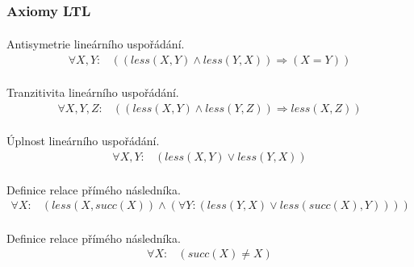 \documentclass[a4paper,journal]{IEEEtran}
\begin{document}
\subsection{}
\subsubsection{Axiomy LTL}
\paragraph*{}{Antisymetrie lineárního uspořádání.}
\begin{equation}
\begin{split}
\forall X,Y:&\left( \left( less \left(X,Y\right) \wedge less\left(Y,X\right) \right) \Rightarrow \left(X = Y\right) \right)
\end{split}
\end{equation}
\paragraph*{}{Tranzitivita lineárního uspořádání.}
\begin{equation}
\begin{split}
\forall X,Y,Z:&\left( \left( less\left(X,Y\right) \wedge less\left(Y,Z\right) \right) \Rightarrow less\left(X,Z\right) \right)
\end{split}
\end{equation}
\paragraph*{}{Úplnost lineárního uspořádání.}
\begin{equation}
\begin{split}
\forall X,Y:&\left(less\left(X,Y\right) \vee less\left(Y,X\right)\right)
\end{split}
\end{equation}
\paragraph*{}{Definice relace přímého následníka.}
\begin{equation}
\begin{split}
\forall X:&\left( less\left(X,succ\left(X\right)\right) \wedge \left(\forall Y:\left(less\left(Y,X\right) \vee less\left(succ\left(X\right),Y\right)\right)\right)  \right)
\end{split}
\end{equation}
\paragraph*{}{Definice relace přímého následníka.}
\begin{equation}
\begin{split}
\forall X:&\left(succ\left(X\right) \neq X\right)
\end{split}
\end{equation}
\end{document}
